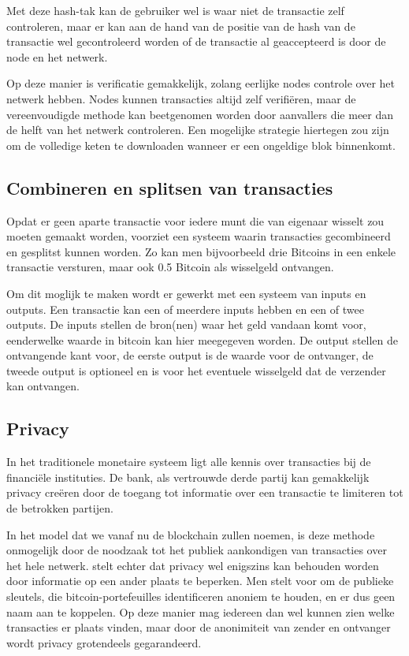 		Met deze hash-tak kan de gebruiker wel is waar niet de transactie zelf controleren, maar er kan aan de hand van de positie van de hash van de transactie wel gecontroleerd worden of de transactie al geaccepteerd is door de node en het netwerk.
		
		Op deze manier is verificatie gemakkelijk, zolang eerlijke nodes controle over het netwerk hebben. Nodes kunnen transacties altijd zelf verifiëren, maar de vereenvoudigde methode kan beetgenomen worden door aanvallers die meer dan de helft van het netwerk controleren. Een mogelijke strategie hiertegen zou zijn om de volledige keten te downloaden wanneer er een ongeldige blok binnenkomt. 
	\subsection{Combineren en splitsen van transacties}
	Opdat er geen aparte transactie voor iedere munt die van eigenaar wisselt zou moeten gemaakt worden, voorziet \textcite{Nakamoto2008} een systeem waarin transacties gecombineerd en gesplitst kunnen worden. Zo kan men bijvoorbeeld drie Bitcoins in een enkele transactie versturen, maar ook 0.5 Bitcoin als wisselgeld ontvangen.
	
	Om dit moglijk te maken wordt er gewerkt met een systeem van inputs en outputs. Een transactie kan een of meerdere inputs hebben en een of twee outputs. De inputs stellen de bron(nen) waar het geld vandaan komt voor, eenderwelke waarde in bitcoin kan hier meegegeven worden. De output stellen de ontvangende kant voor, de eerste output is de waarde voor de ontvanger, de tweede output is optioneel en is voor het eventuele wisselgeld dat de verzender kan ontvangen.
	\subsection{Privacy}
	In het traditionele monetaire systeem ligt alle kennis over transacties bij de financiële instituties. De bank, als vertrouwde derde partij kan gemakkelijk privacy creëren door de toegang tot informatie over een transactie te limiteren tot de betrokken partijen. 
	
	In het model dat we vanaf nu de blockchain zullen noemen, is deze methode onmogelijk door de noodzaak tot het publiek aankondigen van transacties over het hele netwerk.  \textcite{Nakamoto2008} stelt echter dat privacy wel enigszins kan behouden worden door informatie op een ander plaats te beperken. Men stelt voor om de publieke sleutels, die bitcoin-portefeuilles identificeren anoniem te houden, en er dus geen naam aan te koppelen. Op deze manier mag iedereen dan wel kunnen zien welke transacties er plaats vinden, maar door de anonimiteit van zender en ontvanger wordt privacy grotendeels gegarandeerd.
	
